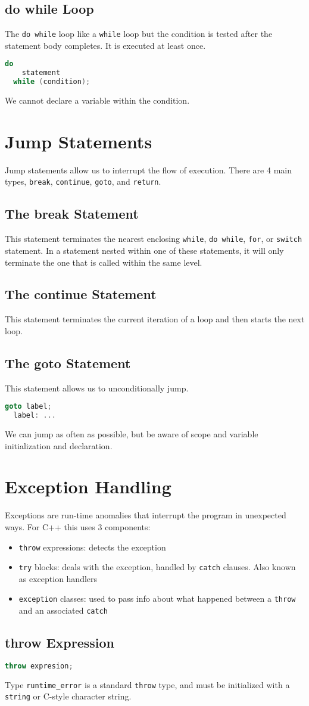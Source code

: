 \documentclass[12pt, a4paper]{report}
\begin{document}
\subsection{do while Loop}
The \verb|do while| loop like a \verb|while| loop but the condition is tested after the statement body completes.
It is executed at least once.
\begin{lstlisting}[language=C++]
  do
    statement
  while (condition);
\end{lstlisting}
We cannot declare a variable within the condition.
\section{Jump Statements}
Jump statements allow us to interrupt the flow of execution.
There are 4 main types, \verb|break|, \verb|continue|, \verb|goto|, and \verb|return|.

\subsection{The break Statement}
This statement terminates the nearest enclosing \verb|while|, \verb|do while|, \verb|for|, or \verb|switch| statement.
In a statement nested within one of these statements, it will only terminate the one that is called within the same level.
\subsection{The continue Statement}
This statement terminates the current iteration of a loop and then starts the next loop.
\subsection{The goto Statement}
This statement allows us to unconditionally jump.
\begin{lstlisting}[language=C++]
  goto label;
  label: ...
\end{lstlisting}
We can jump as often as possible, but be aware of scope and variable initialization and declaration.
\section{Exception Handling}
Exceptions are run-time anomalies that interrupt the program in unexpected ways.
For C++ this uses 3 components:
\begin{itemize}
\item \verb|throw| expressions: detects the exception
\item \verb|try| blocks: deals with the exception, handled by \verb|catch| clauses. Also known as exception handlers
\item \verb|exception| classes: used to pass info about what happened between a \verb|throw| and an associated \verb|catch|
\end{itemize}
\subsection{throw Expression}
\begin{lstlisting}[language=C++]
  throw expresion;
\end{lstlisting}
Type \verb|runtime_error| is a standard \verb|throw| type, and must be initialized with a \verb|string| or C-style character string.
\end{document}
